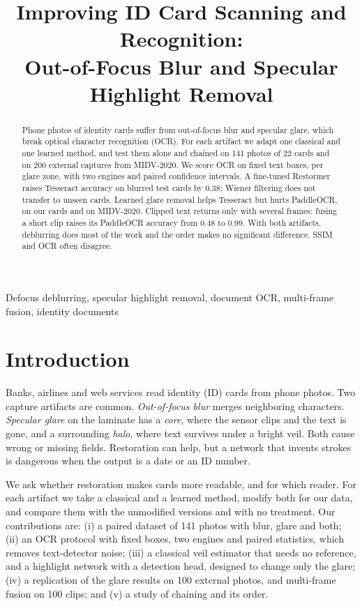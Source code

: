 \documentclass{article}
\title{Improving ID Card Scanning and Recognition:\\Out-of-Focus Blur and Specular Highlight Removal}
\begin{document}
\ninept
\maketitle

\begin{abstract}
Phone photos of identity cards suffer from out-of-focus blur and specular glare, which break optical character recognition (OCR). For each artifact we adapt one classical and one learned method, and test them alone and chained on 141 photos of 22 cards and on 200 external captures from MIDV-2020. We score OCR on fixed text boxes, per glare zone, with two engines and paired confidence intervals. A fine-tuned Restormer raises Tesseract accuracy on blurred test cards by 0.38; Wiener filtering does not transfer to unseen cards. Learned glare removal helps Tesseract but hurts PaddleOCR, on our cards and on MIDV-2020. Clipped text returns only with several frames: fusing a short clip raises its PaddleOCR accuracy from 0.48 to 0.99. With both artifacts, deblurring does most of the work and the order makes no significant difference. SSIM and OCR often disagree.
\end{abstract}
\begin{keywords}
Defocus deblurring, specular highlight removal, document OCR, multi-frame fusion, identity documents
\end{keywords}

\section{Introduction}
\label{sec:intro}
Banks, airlines and web services read identity (ID) cards from phone photos. Two capture artifacts are common. \emph{Out-of-focus blur} merges neighboring characters. \emph{Specular glare} on the laminate has a \emph{core}, where the sensor clips and the text is gone, and a surrounding \emph{halo}, where text survives under a bright veil. Both cause wrong or missing fields. Restoration can help, but a network that invents strokes is dangerous when the output is a date or an ID number.

We ask whether restoration makes cards more readable, and for which reader. For each artifact we take a classical and a learned method, modify both for our data, and compare them with the unmodified versions and with no treatment. Our contributions are: (i) a paired dataset of 141 photos with blur, glare and both; (ii) an OCR protocol with fixed boxes, two engines and paired statistics, which removes text-detector noise; (iii) a classical veil estimator that needs no reference, and a highlight network with a detection head, designed to change only the glare; (iv) a replication of the glare results on 100 external photos, and multi-frame fusion on 100 clips; and (v) a study of chaining and its order.
\end{document}
